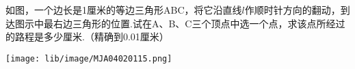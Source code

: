 如图，一个边长是1厘米的等边三角形ABC，将它沿直线$l$作顺时针方向的翻动，到达图示中最右边三角形的位置.试在A、B、C三个顶点中选一个点，求该点所经过的路程是多少厘米.（精确到0.01厘米）

\begin{flushright}

    \texttt{[image: lib/image/MJA04020115.png]}

\end{flushright}



